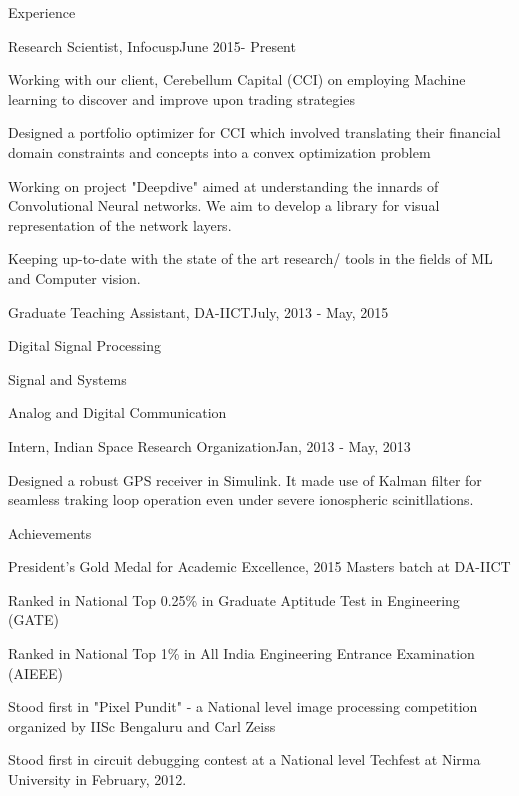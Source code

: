 \documentclass{resume} %
\begin{document}
	\begin{rSection}{Experience}
		
		\begin{rSubsection}{Research Scientist, Infocusp}{June 2015- Present}{}{}
			\item Working with our client, Cerebellum Capital (CCI) on employing Machine learning to discover and improve upon trading strategies
			\item Designed a portfolio optimizer for CCI which involved translating their financial domain constraints and concepts into a convex optimization problem
			\item Working on project "Deepdive" aimed at understanding the innards of Convolutional Neural networks. We aim to  develop a library for visual representation of the network layers.
			\item Keeping up-to-date with the state of the art research/ tools in the fields of ML and Computer vision.

		\end{rSubsection}
		
		
		
		\begin{rSubsection}{Graduate Teaching Assistant, DA-IICT}{July, 2013 - May, 2015}{}{}
			\item Digital Signal Processing 
			\item Signal and Systems
			\item Analog and Digital Communication
		\end{rSubsection}
		
			\begin{rSubsection}{Intern, Indian Space Research Organization}{Jan, 2013 - May, 2013}{}{}
				\item Designed a robust GPS receiver in Simulink. It made use of Kalman filter for seamless traking loop operation even under severe ionospheric scinitllations.
			\end{rSubsection}
	\end{rSection}
	
	
	
	\begin{rSection}{Achievements} \itemsep -2pt
		\item President's Gold Medal for Academic Excellence, 2015 Masters batch at DA-IICT
		\item Ranked in National Top 0.25\% in Graduate Aptitude Test in Engineering (GATE)
		\item Ranked in National Top 1\% in All India Engineering Entrance Examination (AIEEE)
		\item Stood first in "Pixel Pundit" - a National level image processing competition organized by IISc Bengaluru and Carl Zeiss
		\item Stood first in circuit debugging contest at a National level Techfest at Nirma
		University in February, 2012.
	\end{rSection}
	
\end{document}
